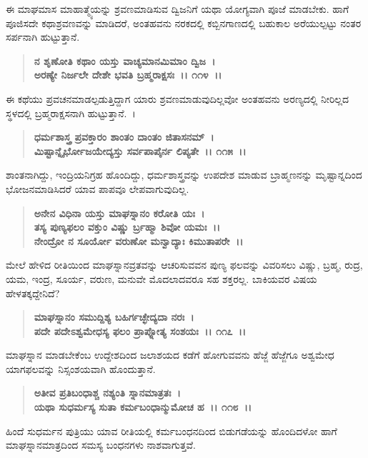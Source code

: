 ಈ ಮಾಘಮಾಸ ಮಾಹಾತ್ಮ್ಯೆಯನ್ನು ಶ್ರವಣಮಾಡಿಸುವ ದ್ವಿಜನಿಗೆ ಯಥಾ ಯೋಗ್ಯವಾಗಿ ಪೂಜೆ ಮಾಡಬೇಕು. ಹಾಗೆ ಪೂಜಿಸದೇ ಕಥಾಶ್ರವಣವನ್ನು ಮಾಡಿದರೆ, ಅಂತಹವನು ನರಕದಲ್ಲಿ ಕಬ್ಬಿನಗಾಣದಲ್ಲಿ ಬಹುಕಾಲ ಅರೆಯುಲ್ಪಟ್ಟು ನಂತರ ಸರ್ಪನಾಗಿ ಹುಟ್ಟುತ್ತಾನೆ.

\begin{verse}
\textbf{ನ ಶೃಣೋತಿ ಕಥಾಂ ಯಸ್ತು ವಾಚ್ಯಮಾನಮಿಮಾಂ ದ್ವಿಜ~।}\\\textbf{ಅರಣ್ಯೇ ನಿರ್ಜಲೇ ದೇಶೇ ಭವತಿ ಬ್ರಹ್ಮರಾಕ್ಷಸಃ~।। ೧೧೪~।।}
\end{verse}

ಈ ಕಥೆಯು ಪ್ರವಚನಮಾಡಲ್ಪಡುತ್ತಿದ್ದಾಗ ಯಾರು ಶ್ರವಣಮಾಡುವುದಿಲ್ಲವೋ ಅಂತಹವನು ಅರಣ್ಯದಲ್ಲಿ ನೀರಿಲ್ಲದ ಸ್ಥಳದಲ್ಲಿ ಬ್ರಹ್ಮರಾಕ್ಷಸನಾಗಿ ಹುಟ್ಟುತ್ತಾನೆ.~।

\begin{verse}
\textbf{ಧರ್ಮಶಾಸ್ತ್ರ ಪ್ರವಕ್ತಾರಂ ಶಾಂತಂ ದಾಂತಂ ಜಿತಾಸನಮ್~।}\\\textbf{ಮಿಷ್ಟಾನ್ನೈರ್ಭೋಜಯೇದ್ಯಸ್ತು ಸರ್ವಪಾಪೈರ್ನ ಲಿಪ್ಯತೇ~।। ೧೧೫~।।}
\end{verse}

ಶಾಂತನಾಗಿದ್ದು, ಇಂದ್ರಿಯನಿಗ್ರಹ ಹೊಂದಿದ್ದು, ಧರ್ಮಶಾಸ್ತ್ರವನ್ನು ಉಪದೇಶ ಮಾಡುವ ಬ್ರಾಹ್ಮಣನನ್ನು ಮೃಷ್ಟಾನ್ನದಿಂದ ಭೋಜನಮಾಡಿಸಿದರೆ ಯಾವ ಪಾಪವೂ ಲೇಪವಾಗುವುದಿಲ್ಲ.

\begin{verse}
\textbf{ಅನೇನ ವಿಧಿನಾ ಯಸ್ತು ಮಾಘಸ್ನಾನಂ ಕರೋತಿ ಯಃ~।}\\\textbf{ತಸ್ಯ ಪುಣ್ಯಫಲಂ ವಕ್ತುಂ ವಿಷ್ಣು ರ್ಬ್ರಹ್ಮಾ ಶಿವೋ ಯಮಃ~।। }\\\textbf{ನೇಂದ್ರೋ ನ ಸೂರ್ಯೋ ವರುಣೋ ಮನ್ವಾದ್ಯಾಃ ಕಿಮುತಾಪರೇ~।।}
\end{verse}

ಮೇಲೆ ಹೇಳಿದ ರೀತಿಯಿಂದ ಮಾಘಸ್ನಾನವ್ರತವನ್ನು ಆಚರಿಸುವವನ ಪುಣ್ಯ ಫಲವನ್ನು ವಿವರಿಸಲು ವಿಷ್ಣು, ಬ್ರಹ್ಮ, ರುದ್ರ, ಯಮ, ಇಂದ್ರ, ಸೂರ್ಯ, ವರುಣ, ಮನುವೇ ಮೊದಲಾದವರೂ ಸಹ ಶಕ್ತರಲ್ಲ. ಬಾಕಿಯವರ ವಿಷಯ ಹೇಳತಕ್ಕದ್ದೇನಿದೆ?

\begin{verse}
\textbf{ಮಾಘಸ್ನಾನಂ ಸಮುದ್ದಿಶ್ಯ ಬಹಿರ್ಗಚ್ಛೇದ್ಯದಾ ನರಃ~।}\\\textbf{ಪದೇ ಪದೇಽಶ್ವಮೇಧಸ್ಯ ಫಲಂ ಪ್ರಾಪ್ನೋತ್ಯ ಸಂಶಯಃ~।। ೧೧೭~।।}
\end{verse}

ಮಾಘಸ್ನಾನ ಮಾಡಬೇಕೆಂಬ ಉದ್ದೇಶದಿಂದ ಜಲಾಶಯದ ಕಡೆಗೆ ಹೋಗುವವನು ಹೆಜ್ಜೆ ಹೆಜ್ಜೆಗೂ ಅಶ್ವಮೇಧ ಯಾಗಫಲವನ್ನು ನಿಸ್ಸಂಶಯವಾಗಿ ಹೊಂದುತ್ತಾನೆ.

\begin{verse}
\textbf{ಅತೀವ ಪ್ರತಿಬಂಧಾಶ್ಚ ನಶ್ಯಂತಿ ಸ್ನಾನಮಾತ್ರತಃ~।}\\\textbf{ಯಥಾ ಸುಧರ್ಮಸ್ಯ ಸುತಾ ಕರ್ಮಬಂಧಾನ್ಮುಮೋಚ ಹ~।। ೧೧೮~।।}
\end{verse}

ಹಿಂದೆ ಸುಧರ್ಮನ ಪುತ್ರಿಯು ಯಾವ ರೀತಿಯಲ್ಲಿ ಕರ್ಮಬಂಧನದಿಂದ ಬಿಡುಗಡೆಯನ್ನು ಹೊಂದಿದಳೋ ಹಾಗೆ ಮಾಘಸ್ನಾನಮಾತ್ರದಿಂದ ಸಮಸ್ಯ ಬಂಧನಗಳು ನಾಶವಾಗುತ್ತವೆ.


